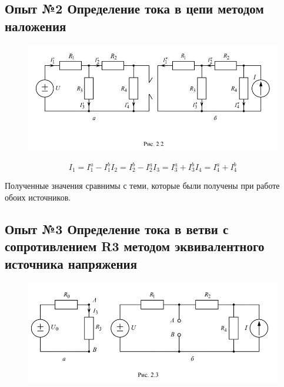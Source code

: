 \documentclass[a4paper,12pt]{report}
\begin{document}
\begin{flushleft}
	\item\subsection*{Опыт №2 Определение тока в цепи методом наложения}
	\item \item \begin{figure}[h!]
        \includegraphics[width=1.1\textwidth]{scheme_2.png}
        \label{ris:image2}
    \end{figure}
    \[I_1=I_1^a-I_1^b     I_2=I_2^b-I_2^a    I_3=I_3^a+I_3^b     I_4=I_4^a+I_4^b\]

    Полученные значения сравнимы с теми, которые были получены при работе обоих источников.
    
    \newpage
	\item\subsection*{Опыт №3 Определение тока в ветви с сопротивлением R3 методом эквивалентного источника напряжения}
	\item \item \begin{figure}[h!]
        \includegraphics[width=1.1\textwidth]{scheme_3.png}
        \label{ris:image3}
    \end{figure}


\end{flushleft}
\end{document}
